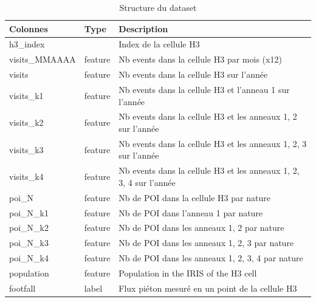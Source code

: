 \begin{table}[H]
    \centering
    \begin{tabular}{|l|l|l|}
    \hline
    \textbf{Colonnes}    & \textbf{Type} & \textbf{Description}                                                    \\ \hline
    h3\_index            &               & Index de la cellule H3                                                  \\ \hline
    visits\_MMAAAA & feature       & Nb events dans la cellule H3 par mois (x12)                        \\ \hline
    visits        & feature       & Nb events dans la cellule H3 sur l'année                          \\ \hline
    visits\_k1     & feature       & Nb events dans la cellule H3 et l'anneau 1 sur l'année            \\ \hline
    visits\_k2     & feature       & Nb events dans la cellule H3 et les anneaux 1, 2 sur l'année       \\ \hline
    visits\_k3     & feature       & Nb events dans la cellule H3 et les anneaux 1, 2, 3 sur l'année    \\ \hline
    visits\_k4     & feature       & Nb events dans la cellule H3 et les anneaux 1, 2, 3, 4 sur l'année \\ \hline
    poi\_N        & feature       & Nb de POI dans la cellule H3 par nature                                 \\ \hline
    poi\_N\_k1    & feature       & Nb de POI dans l'anneau 1 par nature                   \\ \hline
    poi\_N\_k2    & feature       & Nb de POI dans les anneaux 1, 2 par nature              \\ \hline
    poi\_N\_k3    & feature       & Nb de POI dans les anneaux 1, 2, 3 par nature           \\ \hline
    poi\_N\_k4    & feature       & Nb de POI dans les anneaux 1, 2, 3, 4 par nature      \\ \hline
    population           & feature       & Population in the IRIS of the H3 cell                                   \\ \hline
    footfall             & label         & Flux piéton mesuré en un point de la cellule H3                         \\ \hline
    \end{tabular}
    \caption{Structure du dataset}
    \end{table}

